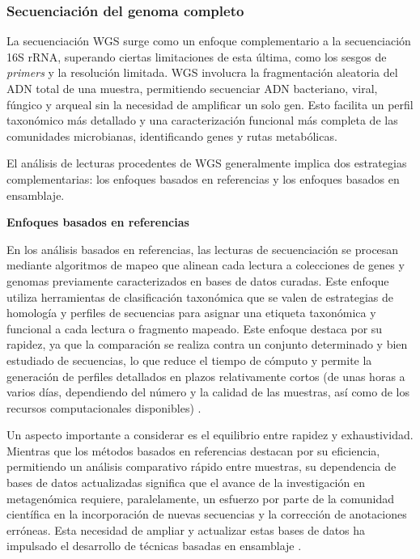 

\subsubsection{Secuenciación del genoma completo}

La secuenciación WGS surge como un enfoque complementario a la secuenciación 16S rRNA, superando ciertas limitaciones de esta última, como los sesgos de \textit{primers} y la resolución limitada. WGS involucra la fragmentación aleatoria del ADN total de una muestra, permitiendo secuenciar ADN bacteriano, viral, fúngico y arqueal sin la necesidad de amplificar un solo gen. Esto facilita un perfil taxonómico más detallado y una caracterización funcional más completa de las comunidades microbianas, identificando genes y rutas metabólicas.

El análisis de lecturas procedentes de WGS generalmente implica dos estrategias complementarias: los enfoques basados en referencias y los enfoques basados en ensamblaje.

\textbf{Enfoques basados en referencias}

En los análisis basados en referencias, las lecturas de secuenciación se procesan mediante algoritmos de mapeo que alinean cada lectura a colecciones de genes y genomas previamente caracterizados en bases de datos curadas. Este enfoque utiliza herramientas de clasificación taxonómica que se valen de estrategias de homología y perfiles de secuencias para asignar una etiqueta taxonómica y funcional a cada lectura o fragmento mapeado. Este enfoque destaca por su rapidez, ya que la comparación se realiza contra un conjunto determinado y bien estudiado de secuencias, lo que reduce el tiempo de cómputo y permite la generación de perfiles detallados en plazos relativamente cortos (de unas horas a varios días, dependiendo del número y la calidad de las muestras, así como de los recursos computacionales disponibles) \cite{bharti2021current}.

Un aspecto importante a considerar es el equilibrio entre rapidez y exhaustividad. Mientras que los métodos basados en referencias destacan por su eficiencia, permitiendo un análisis comparativo rápido entre muestras, su dependencia de bases de datos actualizadas significa que el avance de la investigación en metagenómica requiere, paralelamente, un esfuerzo por parte de la comunidad científica en la incorporación de nuevas secuencias y la corrección de anotaciones erróneas. Esta necesidad de ampliar y actualizar estas bases de datos ha impulsado el desarrollo de técnicas basadas en ensamblaje \cite{bharti2021current}.

